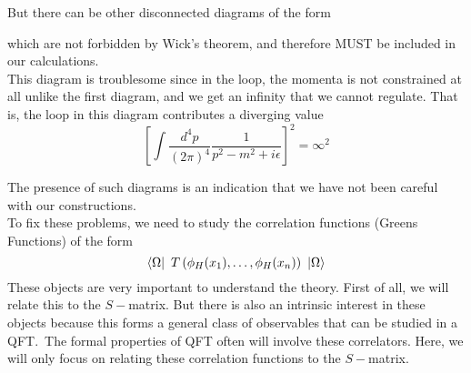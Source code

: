 \documentclass[11pt, notitlepage]{report}
\numberwithin{equation}{section}
\begin{document}
But there can be other disconnected diagrams of the form 
\begin{figure}[h]
    \centering
\end{figure}

which are not forbidden by Wick's theorem, and therefore MUST be included in our calculations.\\

This diagram is troublesome since in the loop, the momenta is not constrained at all unlike the first diagram, and we get an infinity that we cannot regulate. That is, the loop in this diagram contributes a diverging value 
\begin{equation*}
    \left[ \int \frac{d^4 p}{(2\pi)^4} \frac{1}{p^2 - m^2 + i\epsilon}    \right]^2 = \infty^2
\end{equation*}

The presence of such diagrams is an indication that we have not been careful with our constructions.\\

To fix these problems, we need to study the correlation functions (Greens Functions) of the form 
\begin{equation*}
    \bra{\Omega} ~T\left( \phi_H(x_1),\ldots,\phi_H(x_n)  \right)~ \ket{\Omega}
\end{equation*}
These objects are very important to understand the theory. First of all, we will relate this to the \(S-\)matrix. But there is also an intrinsic interest in these objects because this forms a general class of observables that can be studied in a QFT.\ The formal properties of QFT often will involve these correlators. Here, we will only focus on relating these correlation functions to the \(S-\)matrix.
\end{document}
